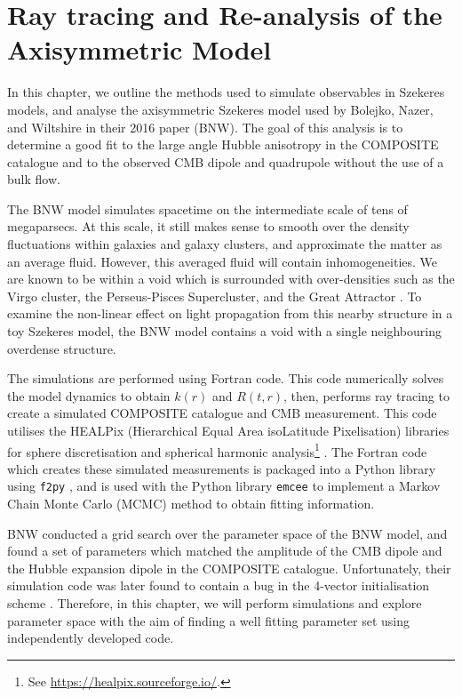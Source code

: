 \documentclass[a4paper,12pt]{report}
\begin{document}
\chapter{Ray tracing and Re-analysis of the Axisymmetric Model} \label{chapter: BNW model analysis}
In this chapter, we outline the methods used to simulate observables in Szekeres models, and analyse the axisymmetric Szekeres model used by Bolejko, Nazer, and Wiltshire in their 2016 paper \cite{RN3} (BNW). The goal of this analysis is to determine a good fit to the large angle Hubble anisotropy in the COMPOSITE catalogue and to the observed CMB dipole and quadrupole without the use of a bulk flow.

The BNW model simulates spacetime on the intermediate scale of tens of megaparsecs. At this scale, it still makes sense to smooth over the density fluctuations within galaxies and galaxy clusters, and approximate the matter as an average fluid. However, this averaged fluid will contain inhomogeneities. We are known to be within a void which is surrounded with over-densities such as the Virgo cluster, the Perseus-Pisces Supercluster, and the Great Attractor \cite{RN168}. To examine the non-linear effect on light propagation from this nearby structure in a toy Szekeres model, the BNW model contains a void with a single neighbouring overdense structure.

The simulations are performed using Fortran code. This code numerically solves the model dynamics to obtain $k(r)$ and $R(t,r)$, then, performs ray tracing to create a simulated COMPOSITE catalogue and CMB measurement. This code utilises the HEALPix (Hierarchical Equal Area isoLatitude Pixelisation) libraries for sphere discretisation and spherical harmonic analysis\footnote{See \url{https://healpix.sourceforge.io/}.} \cite{RN250}. The Fortran code which creates these simulated measurements is packaged into a Python library using \texttt{f2py} \cite{RN112}, and is used with the Python library \texttt{emcee} \cite{RN113,RN111} to implement a Markov Chain Monte Carlo (MCMC) method to obtain fitting information.

BNW \cite{RN3} conducted a grid search over the parameter space of the BNW model, and found a set of parameters which matched the amplitude of the CMB dipole and the Hubble expansion dipole in the COMPOSITE catalogue. Unfortunately, their simulation code was later found to contain a bug in the 4-vector initialisation scheme \cite{RN6,RN42}. Therefore, in this chapter, we will perform simulations and explore parameter space with the aim of finding a well fitting parameter set using independently developed code.
\end{document}
